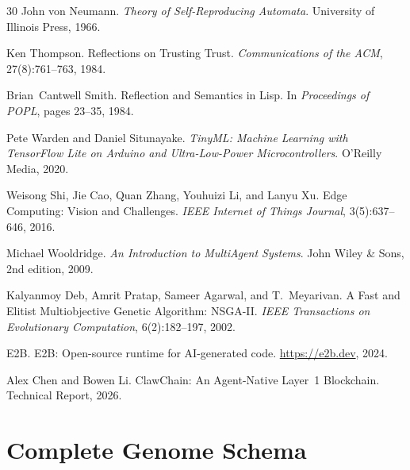\documentclass{article}
\begin{document}
\begin{thebibliography}{30}
John von Neumann.
\newblock \textit{Theory of Self-Reproducing Automata}.
\newblock University of Illinois Press, 1966.

Ken Thompson.
\newblock Reflections on Trusting Trust.
\newblock \textit{Communications of the ACM}, 27(8):761--763, 1984.

Brian~Cantwell Smith.
\newblock Reflection and Semantics in {Lisp}.
\newblock In \textit{Proceedings of POPL}, pages 23--35, 1984.

Pete Warden and Daniel Situnayake.
\newblock \textit{TinyML: Machine Learning with TensorFlow Lite on Arduino and Ultra-Low-Power Microcontrollers}.
\newblock O'Reilly Media, 2020.

Weisong Shi, Jie Cao, Quan Zhang, Youhuizi Li, and Lanyu Xu.
\newblock Edge Computing: Vision and Challenges.
\newblock \textit{IEEE Internet of Things Journal}, 3(5):637--646, 2016.

Michael Wooldridge.
\newblock \textit{An Introduction to MultiAgent Systems}.
\newblock John Wiley \& Sons, 2nd edition, 2009.

Kalyanmoy Deb, Amrit Pratap, Sameer Agarwal, and T.~Meyarivan.
\newblock A Fast and Elitist Multiobjective Genetic Algorithm: {NSGA-II}.
\newblock \textit{IEEE Transactions on Evolutionary Computation}, 6(2):182--197, 2002.

E2B.
\newblock E2B: Open-source runtime for AI-generated code.
\newblock \url{https://e2b.dev}, 2024.

Alex Chen and Bowen Li.
\newblock ClawChain: An Agent-Native Layer~1 Blockchain.
\newblock Technical Report, 2026.

\end{thebibliography}



\appendix

\section{Complete Genome Schema}
\label{app:schema}
\end{document}
